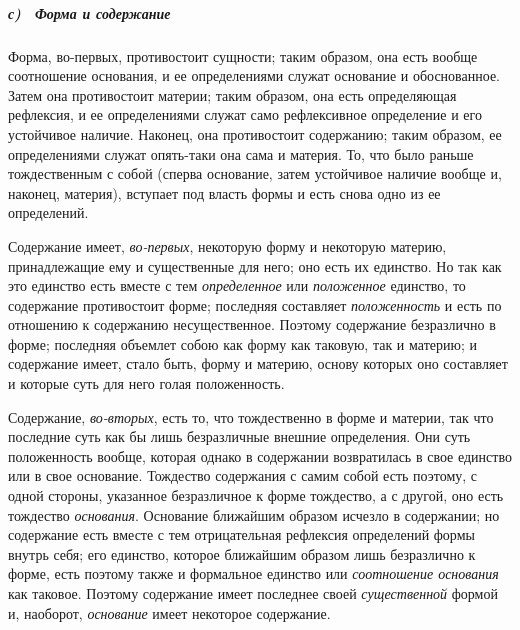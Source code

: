 \subparagraph[с) \ Форма и содержание]{с) \ Форма и содержание}
\hypertarget{Toc478978724}{}Форма, во-первых, противостоит сущности; таким
образом, она есть вообще соотношение основания, и ее определениями служат
основание и обоснованное. Затем она противостоит материи; таким образом,
она есть определяющая рефлексия, и ее определениями служат само
рефлексивное определение и его устойчивое наличие. Наконец, она
противостоит содержанию; таким образом, ее определениями служат опять-таки
она сама и материя. То, что было раньше тождественным с собой (сперва
основание, затем устойчивое наличие вообще и, наконец, материя), вступает
под власть формы и есть снова одно из ее определений.

Содержание имеет, {\em во-первых}, некоторую форму и
некоторую материю, принадлежащие ему и существенные для него; оно есть их
единство. Но так как это единство есть вместе с тем
{\em определенное} или
{\em положенное} единство, то содержание противостоит
форме; последняя составляет {\em положенность} и есть
по отношению к содержанию несущественное. Поэтому содержание безразлично в
форме; последняя объемлет собою как форму как таковую, так и материю; и
содержание имеет, стало быть, форму и материю, основу которых оно
составляет и которые суть для него голая положенность.

Содержание, {\em во-вторых}, есть то, что тождественно в
форме и материи, так что последние суть как бы лишь безразличные внешние
определения. Они суть положенность вообще, которая однако в содержании
возвратилась в свое единство или в свое основание. Тождество содержания с
самим собой есть поэтому, с одной стороны, указанное безразличное к форме
тождество, а с другой, оно есть тождество
{\em основания}. Основание ближайшим образом исчезло в
содержании; но содержание есть вместе с тем отрицательная рефлексия
определений формы внутрь себя; его единство, которое ближайшим образом лишь
безразлично к форме, есть поэтому также и формальное единство или
{\em соотношение основания} как таковое. Поэтому
содержание имеет последнее своей {\em существенной}
формой и, наоборот, {\em основание} имеет некоторое
содержание.

